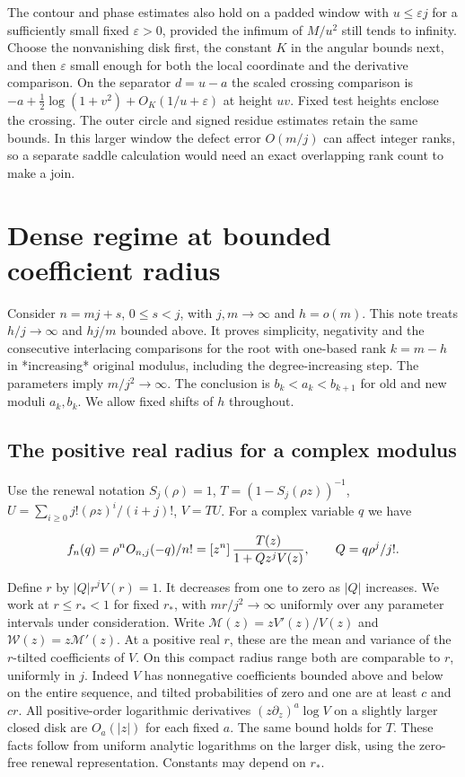 \documentclass[11pt]{article}
\begin{document}
The contour and phase estimates also hold on a padded window with \(u\le\varepsilon j\) for a sufficiently small fixed \(\varepsilon>0\), provided the infimum of \(M/u^2\) still tends to infinity. Choose the nonvanishing disk first, the constant \(K\) in the angular bounds next, and then \(\varepsilon\) small enough for both the local coordinate and the derivative comparison. On the separator \(d=u-a\) the scaled crossing comparison is \(-a+\tfrac12\log(1+v^2)+O_K(1/u+\varepsilon)\) at height \(uv\). Fixed test heights enclose the crossing. The outer circle and signed residue estimates retain the same bounds. In this larger window the defect error \(O(m/j)\) can affect integer ranks, so a separate saddle calculation would need an exact overlapping rank count to make a join.

\section{Dense regime at bounded coefficient radius}
\label{sec:dense}

Consider \(n=mj+s\), \(0\le s<j\), with \(j,m\to\infty\) and \(h=o(m)\). This note treats \(h/j\to\infty\) and \(hj/m\) bounded above. It proves simplicity, negativity and the consecutive interlacing comparisons for the root with one-based rank \(k=m-h\) in *increasing* original modulus, including the degree-increasing step. The parameters imply \(m/j^2\to\infty\). The conclusion is \(b_k<a_k<b_{k+1}\) for old and new moduli \(a_k,b_k\). We allow fixed shifts of \(h\) throughout.

\subsection{The positive real radius for a complex modulus}
\label{sec:the-positive-real-radius-for-a-complex-modulus}

Use the renewal notation \(S_j(\rho)=1\), \(T=(1-S_j(\rho z))^{-1}\), \(U=\sum_{i\ge0}j!(\rho z)^i/(i+j)!\), \(V=TU\). For a complex variable \(q\) we have

\begin{equation*}
f_n(q)=\rho^n O_{n,j}(-q)/n!
=[z^n]\thinspace \frac{T(z)}{1+Qz^j V(z)},\qquad Q=q\rho^j/j!.
\end{equation*}

Define \(r\) by \(|Q|r^j V(r)=1\). It decreases from one to zero as \(|Q|\) increases. We work at \(r\le r_*<1\) for fixed \(r_*\), with \(m r/j^2\to\infty\) uniformly over any parameter intervals under consideration. Write \(\mathcal M(z)=zV'(z)/V(z)\) and \(\mathcal W(z)=z\mathcal M'(z)\). At a positive real \(r\), these are the mean and variance of the \(r\)-tilted coefficients of \(V\). On this compact radius range both are comparable to \(r\), uniformly in \(j\). Indeed \(V\) has nonnegative coefficients bounded above and below on the entire sequence, and tilted probabilities of zero and one are at least \(c\) and \(cr\). All positive-order logarithmic derivatives \((z\partial_z)^a\log V\) on a slightly larger closed disk are \(O_a(|z|)\) for each fixed \(a\). The same bound holds for \(T\). These facts follow from uniform analytic logarithms on the larger disk, using the zero-free renewal representation. Constants may depend on \(r_*\).
\end{document}
